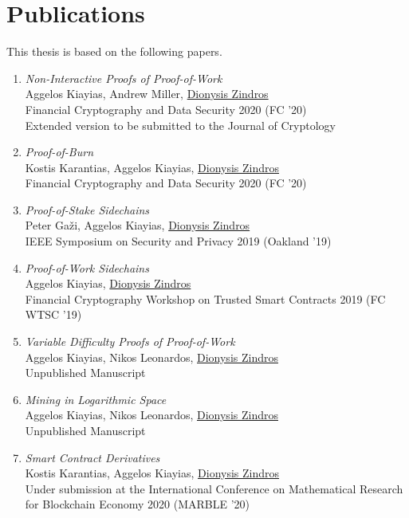 \section*{Publications}

This thesis is based on the following papers.

\begin{enumerate}
  \item
    \emph{Non-Interactive Proofs of Proof-of-Work}\nocite{nipopows}\\
    Aggelos Kiayias, Andrew Miller, \underline{Dionysis Zindros}\\
    Financial Cryptography and Data Security 2020 (FC '20)\\
    Extended version to be submitted to the Journal of Cryptology
  \item
    \emph{Proof-of-Burn}\nocite{burn}\\
    Kostis Karantias, Aggelos Kiayias, \underline{Dionysis Zindros}\\
    Financial Cryptography and Data Security 2020 (FC '20)
  \item
    \emph{Proof-of-Stake Sidechains}\nocite{pos-sidechains}\\
    Peter Ga\v{z}i, Aggelos Kiayias, \underline{Dionysis Zindros}\\
    IEEE Symposium on Security and Privacy 2019 (Oakland '19)
  \item
    \emph{Proof-of-Work Sidechains}\nocite{pow-sidechains}\\
    Aggelos Kiayias, \underline{Dionysis Zindros}\\
    Financial Cryptography Workshop on Trusted Smart Contracts 2019 (FC WTSC '19)
  \item
    \emph{Variable Difficulty Proofs of Proof-of-Work}\nocite{varnipopows}\\
    Aggelos Kiayias, Nikos Leonardos, \underline{Dionysis Zindros}\\
    Unpublished Manuscript
  \item
    \emph{Mining in Logarithmic Space}\nocite{logspace}\\
    Aggelos Kiayias, Nikos Leonardos, \underline{Dionysis Zindros}\\
    Unpublished Manuscript
  \item
    \emph{Smart Contract Derivatives}\nocite{derivatives}\\
    Kostis Karantias, Aggelos Kiayias, \underline{Dionysis Zindros}\\
    Under submission at the
    International Conference on Mathematical Research for Blockchain Economy 2020 (MARBLE '20)\\
\end{enumerate}

